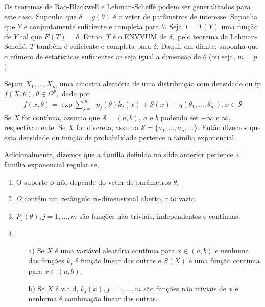 \documentclass[12pt]{beamer}
\begin{document}
\begin{frame}{}
\begin{block}{}
\justifying
Os teoremas de Rao-Blackwell e Lehman-Scheffé podem ser generalizados para este caso. Suponha que $\delta=g(\theta)$ é o vetor de parâmetros de interesse. Suponha que $Y$ é conjuntamente suficiente e completa para $\theta.$ Seja $T=T(Y)$ uma função de $Y$ tal que $E(T)=\delta.$ Então, $T$ é o ENVVUM de $\delta,$ pelo teorema de Lehman-Scheffé. $T$ também é suficiente e completa para $\delta.$ Daqui, em diante, suponha que o número de estatísticas suficientes $m$ seja igual a dimensão de $\theta$ (ou seja, $m=p$).
\end{block}
\end{frame}

\begin{frame}{}
\begin{definicao}
\justifying
Sejam $X_{1},\ldots,X_{m}$ uma amostra aleatória de uma distribuição com densidade ou fp $f(X,\theta),\theta \in \Omega^{p},$ dada por 
\begin{align*}
    f(x,\theta)=\exp{{\displaystyle \sum_{j=1}^{m}p_{j}(\theta)k_{j}(x)+S(x)+q(\theta_{1},\ldots,\theta_{m})}},x\in\mathcal{S}
\end{align*}
Se $X$ for contínua, assuma que $\mathcal{S}=(a,b),~a$ e $b$ podendo ser $-\infty$ e $\infty,$ respectivamente. Se $X$ for discreta, assuma $\mathcal{S}=\{a_{1},\ldots,a_{n},\ldots\}.$ Então dizemos que esta densidade ou função de probabilidade pertence a família exponencial. 
\end{definicao}
\end{frame}

\begin{frame}{}
\begin{block}{}
\justifying
Adicionalmente, dizemos que a família definida no slide anterior pertence a família exponencial regular se,
\begin{enumerate}
    \item O suporte $\mathcal{S}$ não depende do vetor de parâmetros $\theta.$
    \item $\Omega$ contém um retângulo m-dimensional aberto, não vazio.
    \item $P_{j}(\theta),j=1,\ldots,m$ são funções não triviais, independentes e contínuas.
    \item 
    \begin{enumerate}
        \item[a)] Se $X$ é uma variável aleatória contínua para $x\in(a,b)$ e nenhuma das funções $k_{j}$ é função linear das outras e $S(X)$ é uma função contínua para $x\in (a,b).$
        \item[b)] Se $X$ é v.a.d, $k_{j}(x),j=1,\ldots,m$ são funções não triviais de $x$ e nenhuma é combinação linear das outras.
    \end{enumerate}
\end{enumerate}
\end{block}
\end{frame}
\end{document}
